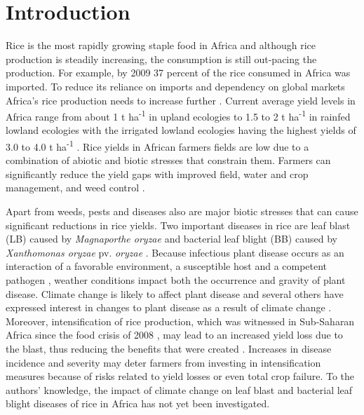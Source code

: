 \section{Introduction}
\label{intro}
Rice is the most rapidly growing staple food in Africa and although rice production is steadily increasing, the consumption is still out-pacing the production. For example, by 2009 37 percent of the rice consumed in Africa was imported. To reduce its reliance on imports and dependency on global markets Africa's rice production needs to increase further \citep{Seck2013}. Current average yield levels in Africa range from about 1 t ha\textsuperscript{-1} in upland ecologies to 1.5 to 2 t ha\textsuperscript{-1} in rainfed lowland ecologies with the irrigated lowland ecologies having the highest yields of 3.0 to 4.0 t ha\textsuperscript{-1} \citep{Diagne2013}. Rice yields in African farmers fields are low due to a combination of abiotic and biotic stresses that constrain them. Farmers can significantly reduce the yield gaps with improved field, water and crop management, and weed control \citep{Saito2013}.
    
    Apart from weeds, pests and diseases also are major biotic stresses that can cause significant reductions in rice yields. Two important diseases in rice are leaf blast (LB) caused by \textit{Magnaporthe oryzae} and bacterial leaf blight (BB) caused by \textit{Xanthomonas oryzae} pv. \textit{oryzae} \citep{Verdier2012}. Because infectious plant disease occurs as an interaction of a favorable environment, a susceptible host and a competent pathogen \citep{Stevens1960}, weather conditions impact both the occurrence and gravity of plant disease. Climate change is likely to affect plant disease \citep{Anderson2004,Coakley1999,Garrett2006} and several others have expressed interest in changes to plant disease as a result of climate change \citep{Chakraborty2011,Juroszek2011,Luck2011,Pautasso2010,Savary2011,Sutherst2011}. Moreover, intensification of rice production, which was witnessed in Sub-Saharan Africa since the food crisis of 2008 \citep{Saito2013}, may lead to an increased yield loss due to the blast, thus reducing the benefits that were created \citep{Sere2013}. Increases in disease incidence and severity may deter farmers from investing in intensification measures because of risks related to yield losses or even total crop failure. To the authors' knowledge, the impact of climate change on leaf blast and bacterial leaf blight diseases of rice in Africa has not yet been investigated.
    
